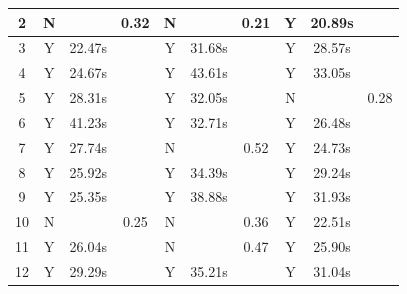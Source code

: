 \begin{table}[t!]
\begin{tabular}{|c|ccc|ccc|ccc|}
2 &
  \multicolumn{1}{c|}{N} &
  \multicolumn{1}{c|}{} &
  0.32 &
  \multicolumn{1}{c|}{N} &
  \multicolumn{1}{c|}{} &
  0.21 &
  \multicolumn{1}{c|}{Y} &
  \multicolumn{1}{c|}{20.89s} &
   \\ \hline
3 &
  \multicolumn{1}{c|}{Y} &
  \multicolumn{1}{c|}{22.47s} &
   &
  \multicolumn{1}{c|}{Y} &
  \multicolumn{1}{c|}{31.68s} &
   &
  \multicolumn{1}{c|}{Y} &
  \multicolumn{1}{c|}{28.57s} &
   \\ \hline
4 &
  \multicolumn{1}{c|}{Y} &
  \multicolumn{1}{c|}{24.67s} &
   &
  \multicolumn{1}{c|}{Y} &
  \multicolumn{1}{c|}{43.61s} &
   &
  \multicolumn{1}{c|}{Y} &
  \multicolumn{1}{c|}{33.05s} &
   \\ \hline
5 &
  \multicolumn{1}{c|}{Y} &
  \multicolumn{1}{c|}{28.31s} &
   &
  \multicolumn{1}{c|}{Y} &
  \multicolumn{1}{c|}{32.05s} &
   &
  \multicolumn{1}{c|}{N} &
  \multicolumn{1}{c|}{} &
  0.28 \\ \hline
6 &
  \multicolumn{1}{c|}{Y} &
  \multicolumn{1}{c|}{41.23s} &
   &
  \multicolumn{1}{c|}{Y} &
  \multicolumn{1}{c|}{32.71s} &
   &
  \multicolumn{1}{c|}{Y} &
  \multicolumn{1}{c|}{26.48s} &
   \\ \hline
7 &
  \multicolumn{1}{c|}{Y} &
  \multicolumn{1}{c|}{27.74s} &
   &
  \multicolumn{1}{c|}{N} &
  \multicolumn{1}{c|}{} &
  0.52 &
  \multicolumn{1}{c|}{Y} &
  \multicolumn{1}{c|}{24.73s} &
   \\ \hline
8 &
  \multicolumn{1}{c|}{Y} &
  \multicolumn{1}{c|}{25.92s} &
   &
  \multicolumn{1}{c|}{Y} &
  \multicolumn{1}{c|}{34.39s} &
   &
  \multicolumn{1}{c|}{Y} &
  \multicolumn{1}{c|}{29.24s} &
   \\ \hline
9 &
  \multicolumn{1}{c|}{Y} &
  \multicolumn{1}{c|}{25.35s} &
   &
  \multicolumn{1}{c|}{Y} &
  \multicolumn{1}{c|}{38.88s} &
   &
  \multicolumn{1}{c|}{Y} &
  \multicolumn{1}{c|}{31.93s} &
   \\ \hline
10 &
  \multicolumn{1}{c|}{N} &
  \multicolumn{1}{c|}{} &
  0.25 &
  \multicolumn{1}{c|}{N} &
  \multicolumn{1}{c|}{} &
  0.36 &
  \multicolumn{1}{c|}{Y} &
  \multicolumn{1}{c|}{22.51s} &
   \\ \hline
11 &
  \multicolumn{1}{c|}{Y} &
  \multicolumn{1}{c|}{26.04s} &
   &
  \multicolumn{1}{c|}{N} &
  \multicolumn{1}{c|}{} &
  0.47 &
  \multicolumn{1}{c|}{Y} &
  \multicolumn{1}{c|}{25.90s} &
   \\ \hline
12 &
  \multicolumn{1}{c|}{Y} &
  \multicolumn{1}{c|}{29.29s} &
   &
  \multicolumn{1}{c|}{Y} &
  \multicolumn{1}{c|}{35.21s} &
   &
  \multicolumn{1}{c|}{Y} &
  \multicolumn{1}{c|}{31.04s} &

\end{tabular}
\end{table}
